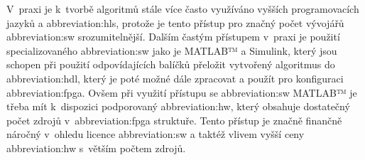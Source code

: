 \documentclass[a4paper, twoside, 11pt]{article}
\begin{document}
		V~praxi je k~tvorbě algoritmů stále více často využíváno vyšších programovacích jazyků a \gls{abbreviation:hls}, protože je tento přístup pro značný počet vývojářů \gls{abbreviation:sw} srozumitelnější. Dalším častým přístupem v~praxi je použití specializovaného \gls{abbreviation:sw} jako je MATLAB™️ a Simulink, který jsou schopen při použití odpovídajících balíčků přeložit vytvořený algoritmus do \gls{abbreviation:hdl}, který je poté možné dále zpracovat a použít pro konfiguraci \gls{abbreviation:fpga}. Ovšem při využití přístupu se \gls{abbreviation:sw} MATLAB™️ je třeba mít k~dispozici podporovaný \gls{abbreviation:hw}, který obsahuje dostatečný počet zdrojů v~\gls{abbreviation:fpga} struktuře. Tento přístup je značně finančně náročný v~ohledu licence \gls{abbreviation:sw} a taktéž vlivem vyšší ceny \gls{abbreviation:hw} s~větším počtem zdrojů.
\end{document}
